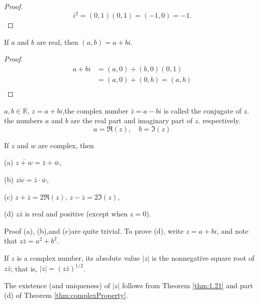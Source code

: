 \begin{proof}
    \begin{equation*}
        i^2=(0,1)(0,1)=(-1,0)=-1.
    \end{equation*}
\end{proof}

\begin{thm}\label{thm:complexnumberTransfer}
    If $a$ and $b$ are real, then $(a,b) =a + bi$.
\end{thm}

\begin{proof}
    \begin{align*}
        a+bi
        &=(a,0)+(b,0)(0,1)\\
        &=(a,0)+(0,b)=(a,b)\\
    \end{align*}
\end{proof}

\begin{myDefinition}\label{myDefinition:conjugate}
    $a,b\in \mathbb{R}$, $z=a+bi$,the complex number $\bar{z}=a-bi$ is called the conjugate of $z$. the numbers $a$ and $b$ are the real part and imaginary part of $z$. respectively.
    \begin{equation*}
        a=\Re(z), \quad
        b=\Im(z)
    \end{equation*}
\end{myDefinition}

\begin{thm}\label{thm:complexProperty}
    If $z$ and $w$ are complex, then

    (a) $\bar{z+w}=\bar{z}+\bar{w}$,

    (b) $\bar{zw}=\bar{z}\cdot\bar{w}$,

    (c) $z+\bar{z}=2\Re(z)$, $z-\bar{z}=2\Im(z)$,

    (d) $z\bar{z}$ is real and positive (except when $z=0$).
\end{thm}
Proof (a), (b),and (c)are quite trivial. To prove (d), write $z = a + bi$,
and note that $z\bar{z} = a^2 + b^2$.

\begin{myDefinition}\label{myDefinition:complex_absolutevalue}
    If $z$ is a complex number, its absolute value $|z|$ is the nonnegative square root of $z\bar{z}$; that is, $|z| = (z\bar{z})^{1/2}$.
\end{myDefinition}
The existence (and uniqueness) of $|z|$ follows from Theorem \ref{thm:1.21} and
part (d) of Theorem \ref{thm:complexProperty}.

